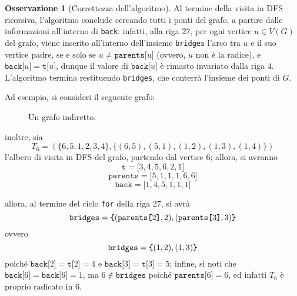 \documentclass[14pt]{extreport}
\theoremstyle{definition}
\theoremstyle{definition}
\newtheorem{remark}{Osservazione}[subsection]
\begin{document}
\begin{remark}[Correttezza dell'algoritmo]
    Al termine della visita in DFS ricorsiva, l'algoritmo conclude cercando tutti i ponti del grafo, a partire dalle informazioni all'interno di \texttt{back}: infatti, alla riga $27$, per ogni vertice $u \in V(G)$ del grafo, viene inserito all'interno dell'insieme \texttt{bridges} l'arco tra $u$ e il suo vertice padre, se e solo se $u \neq \texttt{parents[}u\texttt{]}$ (ovvero, $u$ non è la radice), e $\texttt{back[}u\texttt{]} = \texttt{t[}u\texttt{]}$, dunque il valore di $\texttt{back[}u\texttt{]}$ è rimasto invariato dalla riga $4$. L'algoritmo termina restituendo \texttt{bridges}, che conterrà l'insieme dei ponti di $G$.

    Ad esempio, si consideri il seguente grafo:

    \begin{figure}[H]
        \centering
        \caption{Un grafo indiretto.}
    \end{figure}

    inoltre, sia $$T_6 = (\{6, 5, 1, 2, 3, 4\}, \{(6, 5), (5, 1), (1, 2), (1, 3), (1, 4)\})$$ l'albero di visita in DFS del grafo, partendo dal vertice $6$; allora, si avranno $$\texttt{t} = \texttt{[}3, 4, 5, 6, 2, 1\texttt{]}$$ $$\texttt{parents} = \texttt{[}5, 1, 1, 1, 6, 6\texttt{]}$$ $$\texttt{back} = \texttt{[}1, 4, 5, 1, 1, 1\texttt{]}$$

    allora, al termine del ciclo \texttt{for} della riga $27$, si avrà $$\texttt{bridges} = \verb|{| (\texttt{parents[}2\texttt{]}, 2), (\texttt{parents[}3\texttt{]}, 3)\verb|}|$$ ovvero $$\texttt{bridges} = \verb|{| (1, 2), (1, 3)\verb|}|$$ poiché $\texttt{back[}2\texttt{]} = \texttt{t[}2\texttt{]} = 4$ e $\texttt{back[}3\texttt{]} = \texttt{t[}3\texttt{]} = 5$; infine, si noti che $\texttt{back[}6\texttt{]} = \texttt{back[}6\texttt{]} = 1$, ma $6 \notin \texttt{bridges}$ poiché $\texttt{parents[}6\texttt{]} = 6$, ed infatti $T_6$ è proprio radicato in $6$.
\end{remark}
\end{document}
